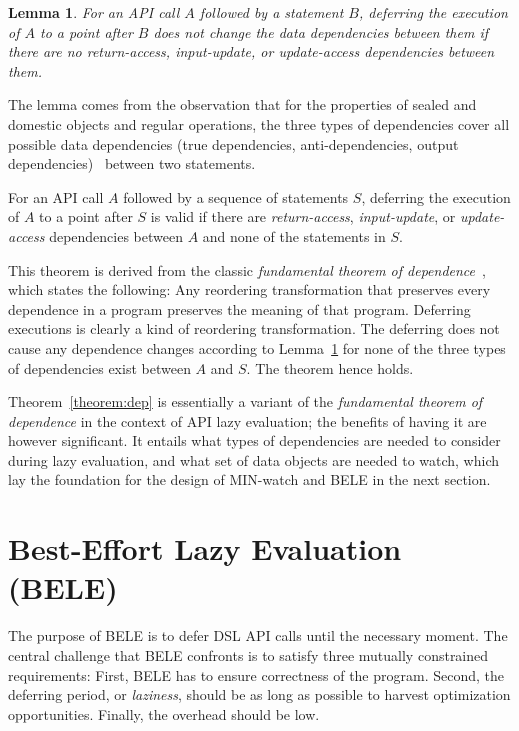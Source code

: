 \documentclass[sigconf]{acmart}\settopmatter{printfolios=true,printccs=false,printacmref=false}\setcopyright{none}
\newtheorem{lemma}{Lemma}
\begin{document}
\begin{lemma}
\label{lemma:dep}
For an API call $A$ followed by a statement $B$, deferring the execution of $A$ to a point after $B$ does not change the data dependencies between them if there are no {\em return-access}, {\em input-update}, or {\em update-access} dependencies between them.
\end{lemma}


The lemma comes from the observation that for the properties of sealed and domestic objects and regular operations, the three types of dependencies cover all possible data dependencies (true dependencies, anti-dependencies, output dependencies)~\cite{AK:Book} between two statements. 


\begin{theorem}
\label{theorem:dep}
For an API call $A$ followed by a sequence of statements $S$, deferring the execution of $A$ to a point after $S$ is valid if there are {\em return-access}, {\em input-update}, or {\em update-access} dependencies between $A$ and none of the statements in $S$.
\end{theorem}

This theorem is derived from the classic {\em fundamental theorem of dependence}~\cite{AK:Book}, which states the following: Any reordering transformation that preserves every dependence in a program preserves the meaning of that program. Deferring executions is clearly a kind of reordering transformation. The deferring does not cause any dependence changes according to Lemma~\ref{lemma:dep} for none of the three types of dependencies exist between $A$ and $S$. The theorem hence holds. 

Theorem~\ref{theorem:dep} is essentially a variant of the {\em fundamental theorem of dependence} in the context of API lazy evaluation; the benefits of having it are however significant. It entails what types of dependencies are needed to consider during lazy evaluation, and what set of data objects are needed to watch, which lay the foundation for the design of MIN-watch and BELE in the next section.


\section{Best-Effort Lazy Evaluation (BELE)}
\label{sec:bele}

The purpose of BELE is to defer DSL API calls until the necessary moment. The central challenge that BELE confronts is to satisfy three mutually constrained requirements: First, BELE has to ensure correctness of the program. Second, the deferring period, or \textit{laziness}, should be as long as possible to harvest optimization opportunities. Finally, the overhead should be low. 
\end{document}

